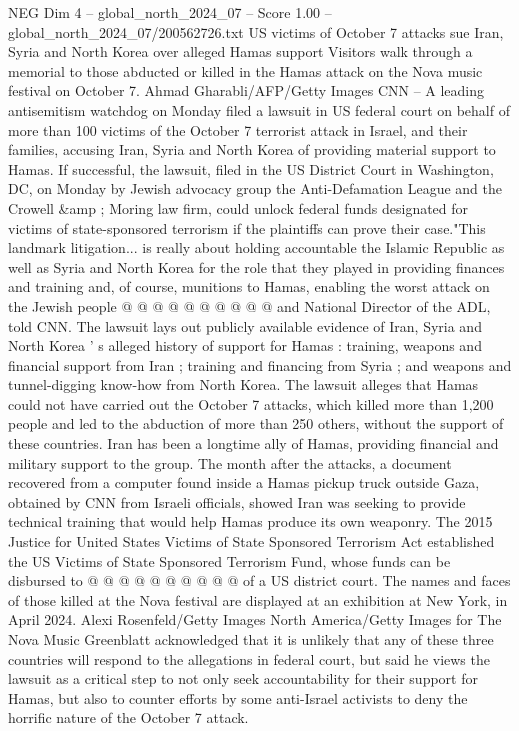 \begin{textsample}{NEG Dim 4 – global\_north\_2024\_07 – Score 1.00 – global\_north\_2024\_07/200562726.txt}  \label{ex:f4_neg_263}
US victims of October 7 attacks sue Iran, Syria and North Korea over alleged Hamas support Visitors walk through a memorial to those abducted or killed in the Hamas attack on the Nova music festival on October 7.
Ahmad Gharabli/AFP/Getty Images CNN -- A leading antisemitism watchdog on Monday filed a lawsuit in US federal court on behalf of more than 100 victims of the October 7 terrorist attack in Israel, and their families, accusing Iran, Syria and North Korea of providing material support to Hamas.
If successful, the lawsuit, filed in the US District Court in Washington, DC, on Monday by Jewish advocacy group the Anti-Defamation League and the Crowell \&amp ; Moring law firm, could unlock federal funds designated for victims of state-sponsored terrorism if the plaintiffs can prove their case."This landmark litigation... is really about holding accountable the Islamic Republic as well as Syria and North Korea for the role that they played in providing finances and training and, of course, munitions to Hamas, enabling the worst attack on the Jewish people @ @ @ @ @ @ @ @ @ @ and National Director of the ADL, told CNN.
The lawsuit lays out publicly available evidence of Iran, Syria and North Korea ' s alleged history of support for Hamas : training, weapons and financial support from Iran ; training and financing from Syria ; and weapons and tunnel-digging know-how from North Korea.
The lawsuit alleges that Hamas could not have carried out the October 7 attacks, which killed more than 1,200 people and led to the abduction of more than 250 others, without the support of these countries.
Iran has been a longtime ally of Hamas, providing financial and military support to the group.
The month after the attacks, a document recovered from a computer found inside a Hamas pickup truck outside Gaza, obtained by CNN from Israeli officials, showed Iran was seeking to provide technical training that would help Hamas produce its own weaponry.
The 2015 Justice for United States Victims of State Sponsored Terrorism Act established the US Victims of State Sponsored Terrorism Fund, whose funds can be disbursed to @ @ @ @ @ @ @ @ @ @ of a US district court.
The names and faces of those killed at the Nova festival are displayed at an exhibition at New York, in April 2024.
Alexi Rosenfeld/Getty Images North America/Getty Images for The Nova Music Greenblatt acknowledged that it is unlikely that any of these three countries will respond to the allegations in federal court, but said he views the lawsuit as a critical step to not only seek accountability for their support for Hamas, but also to counter efforts by some anti-Israel activists to deny the horrific nature of the October 7 attack.

\end{textsample}
